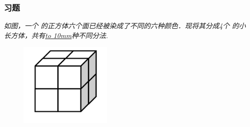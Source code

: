 \begin{frame}
    \frametitle{习题\theframecounter}
    \textit{如图，一个 的正方体六个面已经被染成了不同的六种颜色．现将其分成4个 的小长方体，共有\underline{\hbox to 10mm{}}种不同分法.}
    \begin{figure}[H] 
        \centering
        \includegraphics[width=0.4\textwidth]{./pics/Chapter_6/15.png}
    \end{figure}
\end{frame}